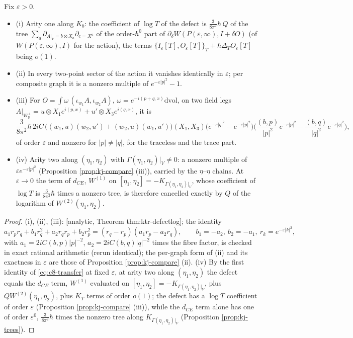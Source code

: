 \begin{proposition}
\label{prop:kj-defectlog}
Fix $\varepsilon>0$.
\begin{itemize}
\item (i) Arity one along $K_b$: the coefficient of $\log T$ of the defect is $\tfrac{3}{8\pi^2}\hbar\,Q$ of the tree $\sum_a\partial_{A|_V=b\otimes X_a}\partial_{c=X^a}$ of the order-$\hbar^0$ part of $\partial_\delta W(P(\varepsilon,\infty),I+\delta O)$ (of $W(P(\varepsilon,\infty),I)$ for the action), the terms $\{I_\varepsilon[T],O_\varepsilon[T]\}_T+\hbar\Delta_TO_\varepsilon[T]$ being $o(1)$.
\item (ii) In every two-point sector of the action it vanishes identically in $\varepsilon$; per composite graph it is a nonzero multiple of $e^{-\varepsilon|p|^2}-1$.
\item (iii) For $O=\int\omega\,(\iota_{w_1}A,\iota_{w_2}A)$, $\omega=e^{-i(p+q,x)}\mathrm{dvol}$, on two field legs $A|_{W_{\mathbb R}^\perp}=u\otimes X_1e^{i(p,x)}+u'\otimes X_3e^{i(q,x)}$, it is
\[
\frac{3}{8\pi^2}\hbar\,2iC\,\big((w_1,u)(w_2,u')+(w_2,u)(w_1,u')\big)(X_1,X_3)\big(e^{-\varepsilon|q|^2}-e^{-\varepsilon|p|^2}\big)\Big(\frac{(b,p)}{|p|^2}e^{-\varepsilon|p|^2}-\frac{(b,q)}{|q|^2}e^{-\varepsilon|q|^2}\Big),
\]
of order $\varepsilon$ and nonzero for $|p|\neq|q|$, for the traceless and the trace part.
\item (iv) Arity two along $(\eta_1,\eta_2)$ with $\Gamma(\eta_1,\eta_2)|_V\neq0$: a nonzero multiple of $\varepsilon e^{-\varepsilon|p|^2}$ (Proposition \ref{prop:kj-compare} (iii)), carried by the $\eta$--$\eta$ chains. At $\varepsilon\to0$ the term of $d_{CE}$, $W^{(1)}$ on $[\eta_1,\eta_2]=-K_{\Gamma(\eta_1,\eta_2)|_V}$, whose coefficient of $\log T$ is $\tfrac{3}{8\pi^2}\hbar$ times a nonzero tree, is therefore cancelled exactly by $Q$ of the logarithm of $W^{(2)}(\eta_1,\eta_2)$.
\end{itemize}
\end{proposition}

\begin{proof}
(i), (ii), (iii): [analytic, Theorem thm:ktr-defectlog]; the identity
\[
a_1r_pr_q+b_1r_q^2+a_2r_qr_p+b_2r_p^2=(r_q-r_p)(a_1r_p-a_2r_q),\qquad b_1=-a_2,\ b_2=-a_1,\ r_k=e^{-\varepsilon|k|^2},
\]
with $a_1=2iC(b,p)|p|^{-2}$, $a_2=2iC(b,q)|q|^{-2}$ times the fibre factor, is checked in exact rational arithmetic (rerun identical); the per-graph form of (ii) and its exactness in $\varepsilon$ are those of Proposition \ref{prop:kj-compare} (ii). (iv) By the first identity of \eqref{eq:c8-transfer} at fixed $\varepsilon$, at arity two along $(\eta_1,\eta_2)$ the defect equals the $d_{CE}$ term, $W^{(1)}$ evaluated on $[\eta_1,\eta_2]=-K_{\Gamma(\eta_1,\eta_2)|_V}$, plus $QW^{(2)}(\eta_1,\eta_2)$, plus $K_T$ terms of order $o(1)$; the defect has a $\log T$ coefficient of order $\varepsilon$ (Proposition \ref{prop:kj-compare} (iii)), while the $d_{CE}$ term alone has one of order $\varepsilon^0$, $\tfrac{3}{8\pi^2}\hbar$ times the nonzero tree along $K_{\Gamma(\eta_1,\eta_2)|_V}$ (Proposition \ref{prop:kj-trees}).
\end{proof}

